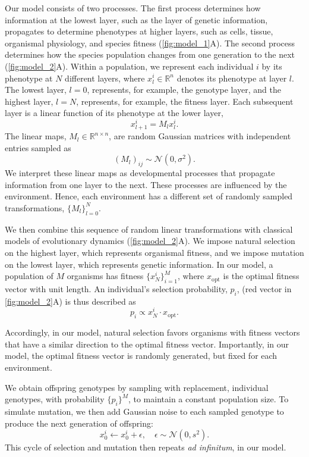 \documentclass[twocolumn]{article}
\begin{document}
Our model consists of two processes. The first process determines how information at the lowest layer, such as the layer of genetic information, propagates to determine phenotypes at higher layers, such as cells, tissue, organismal physiology, and species fitness (\autoref{fig:model_1}A). The second process determines how the species population changes from one generation to the next (\autoref{fig:model_2}A). Within a population, we represent each individual $i$ by its phenotype at $N$ different layers, where $x_l^i \in \mathbb{R}^n$ denotes its phenotype at layer $l$. The lowest layer, $l=0$, represents, for example, the genotype layer, and the highest layer, $l=N$, represents, for example, the fitness layer. Each subsequent layer is a linear function of its phenotype at the lower layer,
\[ x_{l+1}^i = M_{l}x_l^{i}.\]
The linear maps, $M_l \in \mathbb{R}^{n \times n}$, are random Gaussian matrices with independent entries sampled as
\[
(M_l)_{ij} \sim \mathcal{N}(0, \sigma^2).
\]
We interpret these linear maps as developmental processes that propagate information from one layer to the next. These processes are influenced by the environment. Hence, each environment has a different set of randomly sampled transformations, $\{M_l\}_{l=0}^N$.

We then combine this sequence of random linear transformations with classical models of evolutionary dynamics (\autoref{fig:model_2}A). We impose natural selection on the highest layer, which represents organismal fitness, and we impose mutation on the lowest layer, which represents genetic information. In our model, a population of $M$ organisms has fitness $\{x_N^i\}_{i=1}^{M}$, where $x_{\text{opt}}$ is the optimal fitness vector with unit length. An individual's selection probability, $p_i$, (red vector in \autoref{fig:model_2}A) is thus described as 
\[p_i \propto x_N^i \cdot x_{\text{opt}}.\]

Accordingly, in our model, natural selection favors organisms with fitness vectors that have a similar direction to the optimal fitness vector. Importantly, in our model, the optimal fitness vector is randomly generated, but fixed for each environment. 

We obtain offspring genotypes by sampling with replacement, individual genotypes, with probability $\{p_i\}^M$, to maintain a constant population size. To simulate mutation, we then add Gaussian noise to each sampled genotype to produce the next generation of offspring:
\[
x_0^i \leftarrow x_0^i + \epsilon, \quad \epsilon \sim \mathcal{N}(0, s^2).
\]
This cycle of selection and mutation then repeats \textit{ad infinitum}, in our model.
\end{document}
